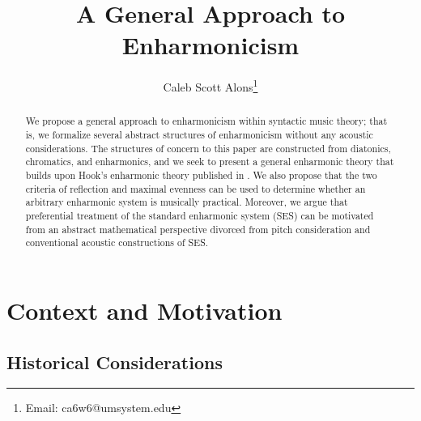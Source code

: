 \documentclass{article}
\author[1]{Caleb Scott Alons\thanks{Email: ca6w6@umsystem.edu}}
\affil[1]{Department of Mathematics, University of Missouri - Columbia}
\theoremstyle{plain}
\theoremstyle{definition}
\theoremstyle{remark}
\begin{document}
\title{A General Approach to Enharmonicism}

\maketitle

\begin{abstract}
	We propose a general approach to enharmonicism within syntactic music theory; that is, we formalize several abstract structures of enharmonicism without any acoustic considerations. The structures of concern to this paper are constructed from diatonics, chromatics, and enharmonics, and we seek to present a general enharmonic theory that builds upon Hook's enharmonic theory published in  \cite{Hook}. We also propose that the two criteria of reflection and maximal evenness can be used to determine whether an arbitrary enharmonic system is musically practical. Moreover, we argue that preferential treatment of the standard enharmonic system (SES) can be motivated from an abstract mathematical perspective divorced from pitch consideration and conventional acoustic constructions of SES.
\end{abstract}

\section{Context and Motivation}
\label{SEC.Context and Motivation}

\subsection{Historical Considerations}
\label{SSEC.Historical Considerations}
\end{document}
